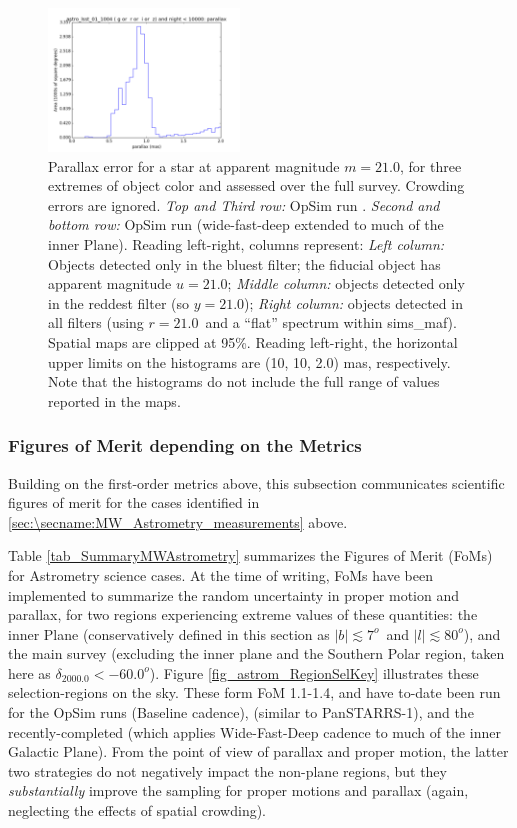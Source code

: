 \begin{figure}[ht]
\begin{center}
  \includegraphics[width=2.0in]{./figs/milkyway/astromPanels/MW_Astrom_paError_wfdPlane_10y_hst.png}
  \end{center}
  \caption{Parallax error for a star at apparent magnitude $m=21.0$, for three extremes of object color and assessed over the full survey. Crowding errors are ignored. {\it Top and Third row:} OpSim run . {\it Second and bottom row:} OpSim run  (wide-fast-deep extended to much of the inner Plane). Reading left-right, columns represent: {\it Left column:} Objects detected only in the bluest filter; the fiducial object has apparent magnitude $u=21.0$; {\it Middle column:} objects detected only in the reddest filter (so $y = 21.0$); {\it Right column:} objects detected in all filters (using $r=21.0$~and a ``flat'' spectrum within sims\_maf). Spatial maps are clipped at 95\%. Reading left-right, the horizontal upper limits on the histograms are (10, 10, 2.0) mas, respectively. Note that the histograms do not include the full range of values reported in the maps.}
  \label{fig_astrom_ByFilter_paError}
\end{figure}

\subsubsection{Figures of Merit depending on the Metrics}

Building on the first-order metrics above, this subsection communicates scientific figures of merit for the cases identified in \autoref{sec:\secname:MW_Astrometry_measurements} above.

Table \ref{tab_SummaryMWAstrometry} summarizes the Figures of Merit
(FoMs) for Astrometry science cases. At the time of writing, FoMs have
been implemented to summarize the random uncertainty in proper motion
and parallax, for two regions experiencing extreme values of these
quantities: the inner Plane (conservatively defined in this section as
$|b| \lesssim 7^o$~and $|l| \lesssim 80^o$), and the main survey
(excluding the inner plane and the Southern Polar region, taken
here as $\delta_{2000.0} < -60.0^o$). Figure
\ref{fig_astrom_RegionSelKey} illustrates these selection-regions on
the sky. These form FoM 1.1-1.4, and have to-date been run for the
OpSim runs  (Baseline cadence),
 (similar to PanSTARRS-1), and the
recently-completed  (which applies
Wide-Fast-Deep cadence to much of the inner Galactic Plane). From the point of
view of parallax and proper motion, the latter two strategies do not
negatively impact the non-plane regions, but they {\it substantially}
improve the sampling for proper motions and parallax (again,
neglecting the effects of spatial crowding).

